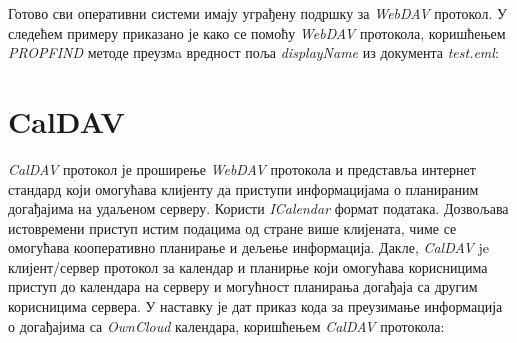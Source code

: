 Готово сви оперативни системи имају уграђену подршку за \textit{WebDAV} протокол. У следећем примеру приказано је како се помоћу \textit{WebDAV} протокола, коришћењем \textit{PROPFIND} методе преузмa вредност поља \textit{displayName} из документа \textit{test.eml}:


\section {CalDAV}

\textit{CalDAV} протокол је проширење \textit{WebDAV} протокола и представља  интернет стандард који омогућава клијенту да приступи информацијама о планираним догађајима на удаљеном серверу. Користи \textit{ICalendar}\cite{ical} формат података. Дозвољава истовремени приступ истим подацима од стране више клијената, чиме се омогућава кооперативно планирање и дељење информација. Дакле, \textit{CalDAV} je клијент/сервер протокол за календар и планирње који омогућава корисницима приступ до календара на серверу и могућност планирања догађаја са другим корисницима сервера. У наставку је дат приказ кода за преузимање информација о догађајима са \textit{OwnCloud} календара, коришћењем \textit{CalDAV} протокола:
